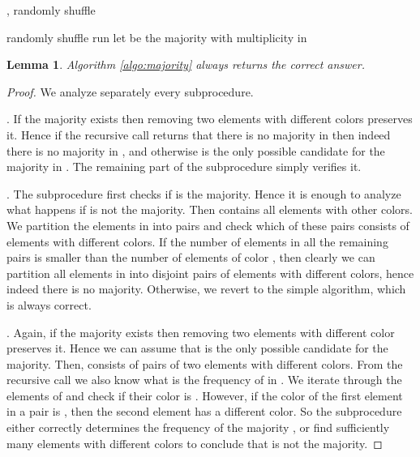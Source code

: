 \documentclass{article}[11pt,a4paper]
\newtheorem{lemma}[definition]{Lemma}
\begin{document}
\begin{algorithm}
\caption{\label{algo:heavy}}
,  \;
\algseparator
\;
randomly shuffle \;
 
\end{algorithm}
\begin{algorithm}
\caption{\label{algo:light}}
randomly shuffle \;
\;
run \;
\algseparator
let  be the majority with multiplicity  in \;
\;
\end{algorithm}

\begin{lemma}
Algorithm \ref{algo:majority} always returns the correct answer.
\end{lemma}

\begin{proof}
We analyze separately every subprocedure.

.
If the majority exists then removing two elements with different colors preserves it.
Hence if the recursive call returns that there is no majority in  then indeed there
is no majority in , and otherwise  is the only possible candidate
for the majority in . The remaining part of the subprocedure simply verifies it.

.
The subprocedure first checks if  is the majority. Hence it is enough to
analyze what happens if  is not the majority. Then  contains all elements
with other colors. We partition the elements in  into pairs and check which of these pairs
consists of elements with different colors. If the number of elements in all the remaining
pairs is smaller than the number of elements of color , then clearly we
can partition all elements in  into disjoint pairs of elements with different colors, hence
indeed there is no majority. Otherwise, we revert to the simple  algorithm,
which is always correct.

.
Again, if the majority exists then removing two elements with different color preserves it.
Hence we can assume that  is the only possible candidate for the
majority. Then,  consists of pairs of two elements with different
colors. From the recursive call we also know what is the frequency of 
in . We iterate through the elements of  and check if their color
is . However, if the color of the first element in a pair is ,
then the second element has a different color. So the subprocedure either correctly
determines the frequency of the majority , or find sufficiently many elements
with different colors to conclude that  is not the majority.
\end{proof}
\end{document}
